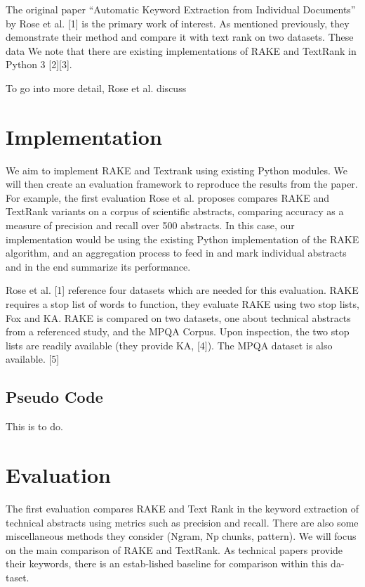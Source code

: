 \documentclass[11pt,a4paper]{article}
\begin{document}
The original paper “Automatic Keyword Extraction from Individual Documents” by Rose et al. [1] is the primary work of interest. As mentioned previously, they demonstrate their method and compare it with text rank on two datasets. These data We note that there are existing implementations of RAKE and TextRank in Python 3 [2][3].

To go into more detail, Rose et al. discuss 

\section{Implementation}

We aim to implement RAKE and Textrank using existing Python modules. We will then create an evaluation framework to reproduce the results from the paper. For example, the first evaluation Rose et al. proposes compares RAKE and TextRank variants on a corpus of scientific abstracts, comparing accuracy as a measure of precision and recall over 500 abstracts. In this case, our implementation would be using the existing Python implementation of the RAKE algorithm, and an aggregation process to feed in and mark individual abstracts and in the end summarize its performance.


Rose et al. [1] reference four datasets which are needed for this evaluation. RAKE requires a stop list of words to function, they evaluate RAKE using two stop lists, Fox and KA. RAKE is compared on two datasets, one about technical abstracts from a referenced study, and the MPQA Corpus. Upon inspection, the two stop lists are readily available (they provide KA, [4]). The MPQA dataset is also available. [5]

\subsection {Pseudo Code}
This is to do.

\section{Evaluation}

The first evaluation compares RAKE and Text Rank in the keyword extraction of technical abstracts using metrics such as precision and recall. There are also some miscellaneous methods they consider (Ngram, Np chunks, pattern). We will focus on the main comparison of RAKE and TextRank. As technical papers provide their keywords, there is an estab-lished baseline for comparison within this da-taset.
\end{document}
